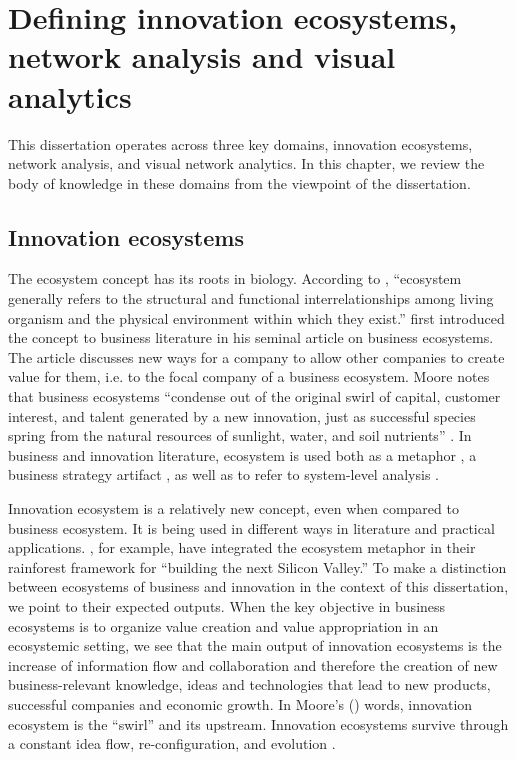 \chapter{Defining innovation ecosystems, network analysis and visual analytics}
\label{ch:background}

This dissertation operates across three key domains,  innovation ecosystems, network analysis, and visual network analytics. In this chapter, we review the body of knowledge in these domains from the viewpoint of the dissertation.

\section{Innovation ecosystems}
\label{sec:innovationecosystems}

The ecosystem concept has its roots in biology. According to \cite{Moran1990ThePractice}, ``ecosystem generally refers to the structural and functional interrelationships among living organism and the physical environment within which they exist.'' \cite{Moore1993PredatorsCompetition} first introduced the concept to business literature in his seminal article on business ecosystems. The article discusses new ways for a company to allow other companies to create value for them, i.e. to the focal company of a business ecosystem. Moore notes that business ecosystems ``condense out of the original swirl of capital, customer interest, and talent generated by a new innovation, just as successful species spring from the natural resources of sunlight, water, and soil nutrients'' \citep{Moore1993PredatorsCompetition}. In business and innovation literature, ecosystem is used both as a metaphor \citep[e.g.][]{Hwang2012,Huhtamaki2011AFinancing}, a business strategy artifact \citep{Moore1993PredatorsCompetition}, as well as to refer to system-level analysis \citep[cf.][]{Pentland2015}.

Innovation ecosystem is a relatively new concept, even when compared to business ecosystem. It is being used in different ways in literature and practical applications. \cite{Hwang2012}, for example, have integrated the ecosystem metaphor in their rainforest framework for ``building the next Silicon Valley.'' To make a distinction between ecosystems of business and innovation in the context of this dissertation, we point to their expected outputs. When the key objective in business ecosystems is to organize value creation and value appropriation in an ecosystemic setting, we see that the main output of innovation ecosystems is the increase of information flow and collaboration and therefore the creation of new business-relevant knowledge, ideas and technologies that lead to new products, successful companies and economic growth. In Moore's (\citeyear{Moore1993PredatorsCompetition}) words, innovation ecosystem is the ``swirl'' and its upstream. Innovation ecosystems survive through a constant idea flow, re-configuration, and evolution \citep[cf.][]{Pentland2015}.

